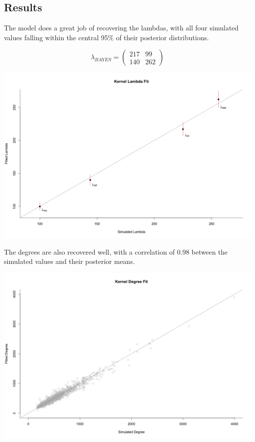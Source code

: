 \documentclass[12pt]{article}
\begin{document}
\subsection*{Results}
The model does a great job of recovering the lambdas, with all four simulated values falling within the central 95\% of their posterior distributions.

$$ \lambda_{BAYES}
= \left( \begin{array}{cc}
217 & 99 \\
140 & 262 \end{array} \right) $$

\includegraphics[scale = 0.39]{Lambda_Estimates.png}

\pagebreak
\noindent The degrees are also recovered well, with a correlation of 0.98 between the simulated values and their posterior means.

\includegraphics[scale = 0.38]{Degree_Estimates.png}
\end{document}
